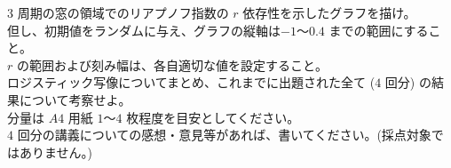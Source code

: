 \documentclass[dvipdfmx,uplatex]{jsarticle}
\begin{document}
  3 周期の窓の領域でのリアプノフ指数の $r$ 依存性を示したグラフを描け。\\
但し、初期値をランダムに与え、グラフの縦軸は$-1$～$0.4$ までの範囲にすること。\\
$r$ の範囲および刻み幅は、各自適切な値を設定すること。\\

  ロジスティック写像についてまとめ、これまでに出題された全て ($4$ 回分) の結果について考察せよ。\\
分量は $A4$ 用紙 $1$～$4$ 枚程度を目安としてください。\\

$4$ 回分の講義についての感想・意見等があれば、書いてください。(採点対象ではありません。)\\
\end{document}
